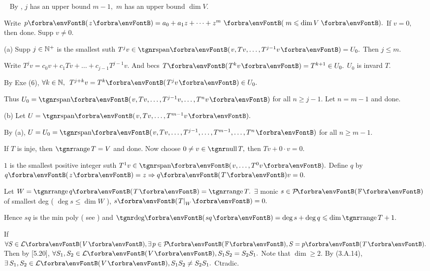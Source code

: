 \par\quad
\Comment\,\,\, By \NOTEFOR [8.40], $j$ has an upper bound $m-1,$ $m$ has an upper bound $\dim V.$\par\quad
Write $p\Par{z}=a_0 +a_1 z+\dots+z^m \,\,\Par{\,m\leqslant \dim V\,}.$ If $v=0,$ then done. Supp $v\neq 0.$\par\quad
(a) Supp $j\in{\mathbb{N}^+}$ is the smallest suth $T^j v\in\Span{v,Tv,\dots,T^{j-1}v}=U_0.$ Then $j\leqslant m.$\par\quad\Ha
Write $T^j v=c_0 v+c_1 Tv+\dots+c_{j-1}T^{j-1}v.$ And becs $T\Par{T^k v}=T^{k+1}\in U_0.$ $U_0$ is invard $T.$\par\quad\Ha
By Exe (6), $\forall k\in\Nbb,\,\,\,T^{j+k}v=T^k\Par{T^j v}\in U_0.$\par\quad\Ha
Thus $U_0=\Span{v,Tv,\dots,T^{j-1} v,\dots,T^n v}$ for all $n\geqslant j-1.$ Let $n=m-1$ and done.\par\quad
(b) Let $U=\Span{v,Tv,\dots,T^{m-1}v}.$\par\quad\Hb
By (a), $U=U_0=\Span{v,Tv,\dots,T^{j-1},\dots,T^{m-1},\dots,T^n}$ for all $n\geqslant m-1.$\PfEnd
\SepLine

\par\quad
If $T$ is inje, then $\range T=V$ and done. Now choose $0\neq v\in\null T,$ then $Tv+0\cdot v=0.$\par\quad
$1$ is the smallest positive integer suth $T^1 v\in\Span{v,\dots,T^0 v}.$ Define $q$ by $q\Par{z}=z\Rightarrow q\Par{T}v=0.$\par\quad
Let $W=\range q\Par{T}=\range T.$ $\exists$ monic $s\in\PoFi$ of smallest deg ( $\deg s\leqslant\dim W$ ), $s\Par{T\mmid_W}=0.$\par\quad
Hence $sq$ is the min poly ( see \NOTEFOR [8.40] ) and $\Deg\Par{sq}=\deg s+\deg q\leqslant\dim\range T+1.$\PfEnd
\SepLine

If $\forall S\in\Lm{V},\exists\,p\in\PoFi,S=p\Par{T}.$ Then by [5.20], $\forall S_1,S_2\in\Lm{V},S_1S_2=S_2S_1.$\parSol{}
Note that $\dim\geqslant 2.$ By (3.A.14), $\exists\,S_1,S_2\in\Lm{V},S_1S_2\neq S_2S_1.$ Ctradic.\PfEnd
\SepLine

